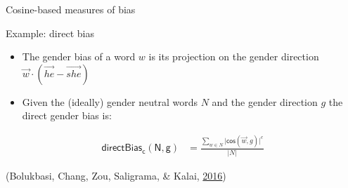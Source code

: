 \documentclass[10pt,ignorenonframetext,x11names, dvipsnames, bibspacing,natbib]{beamer}
\providecommand{\tightlist}{%
  \setlength{\itemsep}{0pt}\setlength{\parskip}{0pt}}
\begin{document}
\begin{frame}{Cosine-based measures of bias}

\begin{block}{Example: direct bias}

\begin{itemize}
\tightlist
\item
  The gender bias of a word \(w\) is its projection on the gender
  direction
  \(\vec{w} \cdot (\overrightarrow{he} - \overrightarrow{she})\)
\end{itemize}

\begin{itemize}
\tightlist
\item
  Given the (ideally) gender neutral words \(N\) and the gender
  direction \(g\) the direct gender bias is: 
\end{itemize}

\vspace{-2mm}

\begin{align}
\mathsf{directBias_c(N,g)} & = \frac{\sum_{w\in N}\vert \mathsf{cos}(\vec{w},g)\vert^c}{\vert N \vert }
\end{align}

\footnotesize 

(Bolukbasi, Chang, Zou, Saligrama, \& Kalai,
\protect\hyperlink{ref-Bolukbasi2016Man}{2016})

\end{block}

\end{frame}
\end{document}
